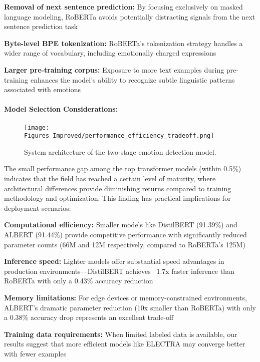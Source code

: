 \documentclass[12pt]{article}
\begin{document}
    \textbf{Removal of next sentence prediction:} By focusing exclusively on masked language modeling, RoBERTa avoids potentially distracting signals from the next sentence prediction task
    
    \textbf{Byte-level BPE tokenization:} RoBERTa's tokenization strategy handles a wider range of vocabulary, including emotionally charged expressions
    
    \textbf{Larger pre-training corpus:} Exposure to more text examples during pre-training enhances the model's ability to recognize subtle linguistic patterns associated with emotions

\paragraph{Model Selection Considerations:}
\begin{figure}[h]
    \centering
    \texttt{[image: Figures\_Improved/performance\_efficiency\_tradeoff.png]}
    \caption{System architecture of the two-stage emotion detection model.}
    \label{fig:efficiency_tradeoff}
\end{figure}

The small performance gap among the top transformer models (within 0.5\%) indicates that the field has reached a certain level of maturity, where architectural differences provide diminishing returns compared to training methodology and optimization. This finding has practical implications for deployment scenarios:

    \textbf{Computational efficiency:} Smaller models like DistilBERT (91.39\%) and ALBERT (91.44\%) provide competitive performance with significantly reduced parameter counts (66M and 12M respectively, compared to RoBERTa's 125M)
    
    \textbf{Inference speed:} Lighter models offer substantial speed advantages in production environments—DistilBERT achieves ~1.7x faster inference than RoBERTa with only a 0.43\% accuracy reduction
    
    \textbf{Memory limitations:} For edge devices or memory-constrained environments, ALBERT's dramatic parameter reduction (10x smaller than RoBERTa) with only a 0.38\% accuracy drop represents an excellent trade-off
    
    \textbf{Training data requirements:} When limited labeled data is available, our results suggest that more efficient models like ELECTRA may converge better with fewer examples
\end{document}

